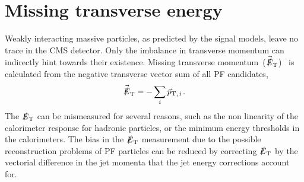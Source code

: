 \section{Missing transverse energy}
Weakly interacting massive particles, as predicted by the signal models, leave no trace in the CMS detector. Only the imbalance in transverse momentum can indirectly hint towards their existence. Missing transverse momentum~($\vec{\slashed{E}}_{\rm T}$)~\cite{MET} is calculated from the negative transverse vector sum of all PF candidates,
 \begin{eqnarray}
 \label{Eqn:MET}
{\ensuremath{\vec{\slashed{E}}_{\rm T}}=  -\sum_i\ensuremath{\vec{p}_{\rm T,\,i}}}\,.
\end{eqnarray}
The $\slashed{E}_{\rm T}$ can be mismeasured for several reasons, such as the non linearity of the calorimeter response for hadronic particles, or the minimum energy thresholds in the calorimeters. The bias in the $\slashed{E}_{\rm T}$ measurement due to the possible reconstruction problems of PF particles can be reduced by correcting $\slashed{E}_{\rm T}$ by the vectorial difference in the jet momenta that the jet energy corrections account for.

